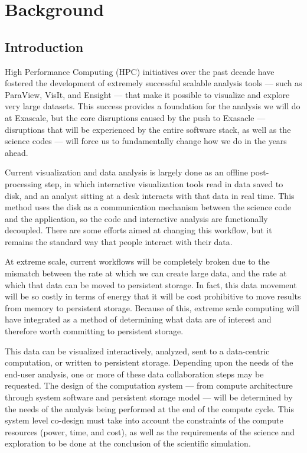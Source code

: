 \section{Background}
\label{sec:Background}

\subsection{Introduction}

High Performance Computing (HPC) initiatives over the past decade have 
fostered the development of extremely successful scalable analysis tools ---
such as ParaView, VisIt, and Ensight --- that make it possible to visualize 
and explore very large datasets.  This success provides a foundation for 
the analysis we will do at Exascale, but the core disruptions caused by
the push to Exasacle --- disruptions that will be experienced by the entire
software stack, as well as the science codes --- will force us to fundamentally
change how we do \vda in the years ahead.

Current visualization and data analysis is largely done as an offline
post-processing step, in which interactive visualization tools read in data
saved to disk, and an analyst sitting at a desk interacts with that data in
real time.  This method uses the disk as a communication mechanism between
the science code and the \vda application, so the code and interactive
analysis are functionally decoupled.  There are some efforts aimed at
changing this workflow, but it remains the standard way that people
interact with their data.

At extreme scale, current workflows will be completely broken due to 
the mismatch
between the rate at which we can create large data, and the rate at
which that data can be moved to persistent storage.  In fact, this
data movement will be so costly in terms of energy that it will be
cost prohibitive to move results from memory to persistent storage.
Because of this, extreme scale computing will have integrated \vda as a
method of determining what data are of interest and therefore worth
committing to persistent storage.

This data can be visualized interactively, analyzed,
sent to a data-centric computation, or written to persistent
storage.  Depending upon the needs of the end-user analysis, one or
more of these data collaboration steps may be requested.  The design
of the computation system --- from compute architecture through system
software and persistent storage model --- will be determined by the
needs of the analysis being performed at the end of the compute
cycle.  This system level co-design must take into account the
constraints of the compute resources (power, time, and cost), as
well as the requirements of the science and exploration to be done
at the conclusion of the scientific simulation.

